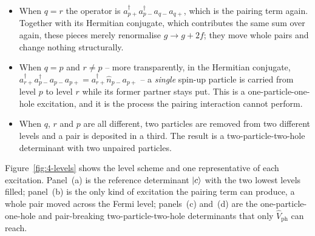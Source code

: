 \begin{itemize}
\item When $q=r$ the operator is
  $a^{\dagger}_{p+}a^{\dagger}_{p-}a_{q-}a_{q+}$, which is the pairing term
  again.  Together with its Hermitian conjugate, which contributes the same
  sum over again, these pieces merely renormalise $g\to g+2f$; they move whole
  pairs and change nothing structurally.
\item When $q=p$ and $r\ne p$ -- more transparently, in the Hermitian
  conjugate, $a^{\dagger}_{r+}a^{\dagger}_{p-}a_{p-}a_{p+}
  = a^{\dagger}_{r+}\hat{n}_{p-}a_{p+}$ -- a \emph{single} spin-up particle is
  carried from level $p$ to level $r$ while its former partner stays put.
  This is a one-particle-one-hole excitation, and it is the process the
  pairing interaction cannot perform.
\item When $q$, $r$ and $p$ are all different, two particles are removed from
  two different levels and a pair is deposited in a third.  The result is a
  two-particle-two-hole determinant with two unpaired particles.
\end{itemize}

Figure~\ref{fig:4-levels} shows the level scheme and one representative of
each excitation.  Panel~(a) is the reference determinant $\vert c \rangle$ with the
two lowest levels filled; panel~(b) is the only kind of excitation the pairing
term can produce, a whole pair moved across the Fermi level; panels~(c)
and~(d) are the one-particle-one-hole and pair-breaking
two-particle-two-hole determinants that only $\hat{V}_{\mathrm{ph}}$ can
reach.

